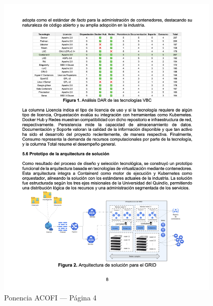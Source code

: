 \begin{figure}[H]
	\centering
	\begin{tcolorbox}[
			colback=white,
			colframe=gray!50,
			boxrule=1pt,
			arc=2pt,
			boxsep=5pt,
			left=3pt,
			right=3pt,
			top=3pt,
			bottom=3pt,
			drop shadow
		]
		\includegraphics[width=0.95\textwidth,keepaspectratio]{apendices/ACOFI/pagina_4.png}
	\end{tcolorbox}
	\caption{Ponencia ACOFI --- Página 4}\label{fig:acofi-pagina-4}
\end{figure}
\FloatBarrier%
